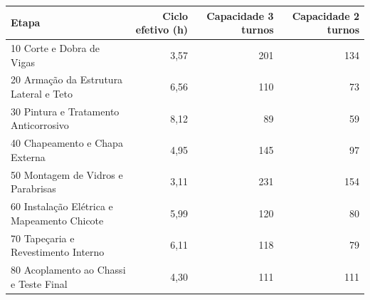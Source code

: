 \begin{tabular}{@{}p{}rrr@{}}
\toprule
\textbf{Etapa} & \textbf{Ciclo efetivo (h)} & \textbf{Capacidade 3 turnos} & \textbf{Capacidade 2 turnos} \\
\midrule
10 Corte e Dobra de Vigas & 3,57 & 201 & 134 \\
20 Armação da Estrutura Lateral e Teto & 6,56 & 110 & 73 \\
30 Pintura e Tratamento Anticorrosivo & 8,12 & 89 & 59 \\
40 Chapeamento e Chapa Externa & 4,95 & 145 & 97 \\
50 Montagem de Vidros e Parabrisas & 3,11 & 231 & 154 \\
60 Instalação Elétrica e Mapeamento Chicote & 5,99 & 120 & 80 \\
70 Tapeçaria e Revestimento Interno & 6,11 & 118 & 79 \\
80 Acoplamento ao Chassi e Teste Final & 4,30 & 111 & 111 \\
\bottomrule
\end{tabular}
